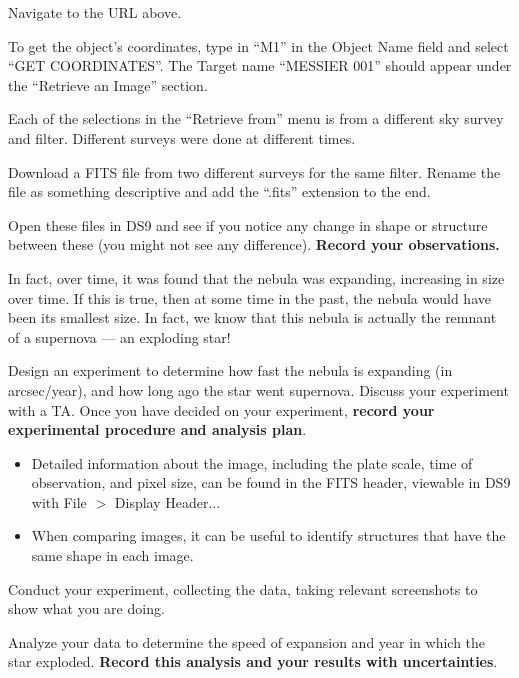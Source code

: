 \begin{steps}
	\item Navigate to the URL above.
	
	\item To get the object's coordinates, type in ``M1'' in the Object Name field and select ``GET COORDINATES''. The Target name ``MESSIER 001'' should appear under the ``Retrieve an Image'' section.
	
	\item Each of the selections in the ``Retrieve from'' menu is from a different sky survey and filter. Different surveys were done at different times.
	
	\item Download a FITS file from two different surveys for the same filter. Rename the file as something descriptive and add the ``.fits'' extension to the end.
	
	\item Open these files in DS9 and see if you notice any change in shape or structure between these (you might not see any difference). \textbf{Record your observations.}
\end{steps}

In fact, over time, it was found that the nebula was expanding, increasing in size over time. If this is true, then at some time in the past, the nebula would have been its smallest size. In fact, we know that this nebula is actually the remnant of a supernova --- an exploding star!

\begin{steps}
	\item Design an experiment to determine how fast the nebula is expanding (in arcsec/year), and how long ago the star went supernova. Discuss your experiment with a TA. Once you have decided on your experiment, \textbf{record your experimental procedure and analysis plan}.
	\begin{itemize}
		\item Detailed information about the image, including the plate scale, time of observation, and pixel size, can be found in the FITS header, viewable in DS9 with File $>$ Display Header...
		
		\item When comparing images, it can be useful to identify structures that have the same shape in each image.
	\end{itemize}
	
	\item Conduct your experiment, collecting the data, taking relevant screenshots to show what you are doing.
	
	\item Analyze your data to determine the speed of expansion and year in which the star exploded. \textbf{Record this analysis and your results with uncertainties}.
\end{steps}

